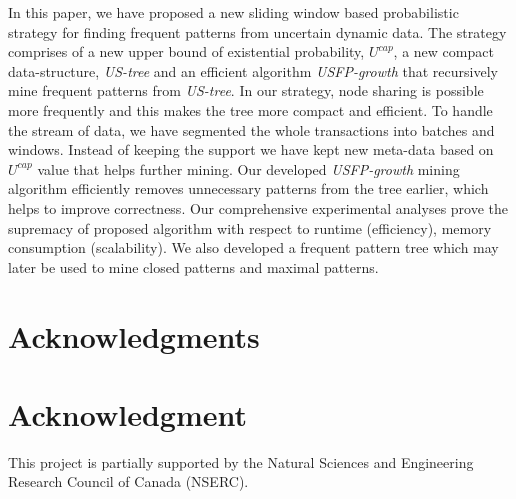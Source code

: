 \documentclass[10pt, conference, compsocconf]{IEEEtran}
\begin{document}
In this paper, we have proposed a new sliding window based probabilistic strategy for finding frequent patterns from uncertain dynamic data. The strategy comprises of a new upper bound of existential probability, $U^{cap}$, a new compact data-structure, \emph{US-tree} and an efficient algorithm \emph{USFP-growth} that recursively mine frequent patterns from \emph{US-tree}. In our strategy, node sharing is possible more frequently and this makes the tree more compact and efficient. To handle the stream of data, we have segmented the whole transactions into batches and windows. Instead of keeping the support we have kept new meta-data based on $U^{cap}$ value that helps further mining. Our developed \emph{USFP-growth} mining algorithm efficiently removes unnecessary patterns from the tree earlier, which helps to improve correctness. Our comprehensive experimental analyses prove the supremacy of proposed algorithm with respect to runtime (efficiency), memory consumption (scalability). We also developed a frequent pattern tree which may later be used to mine closed patterns and maximal patterns.

\ifCLASSOPTIONcompsoc
  \section*{Acknowledgments}
\else
  \section*{Acknowledgment}
\fi

This project is partially supported by the Natural Sciences and Engineering Research Council of Canada (NSERC).
\end{document}
